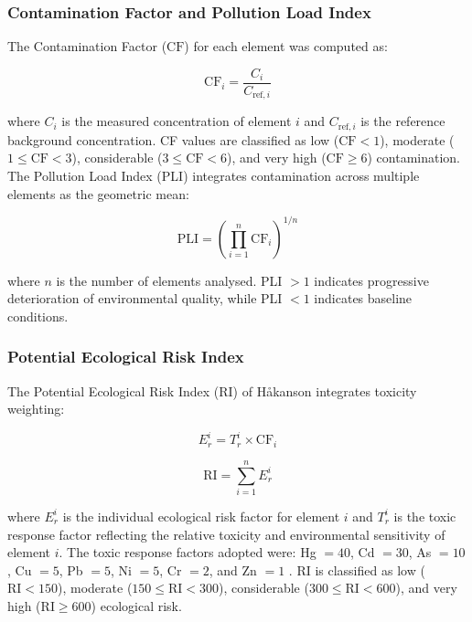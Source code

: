 \documentclass[preprint,12pt,number]{elsarticle}
\begin{document}
\subsubsection{Contamination Factor and Pollution Load Index}

The Contamination Factor ($\text{CF}$) for each element was computed as:

\begin{equation}
\text{CF}_i = \frac{C_i}{C_{\text{ref},i}}
\label{eq:cf}
\end{equation}

\noindent where $C_i$ is the measured concentration of element $i$ and $C_{\text{ref},i}$ is the reference background concentration. CF values are classified as low ($\text{CF} < 1$), moderate ($1 \leq \text{CF} < 3$), considerable ($3 \leq \text{CF} < 6$), and very high ($\text{CF} \geq 6$) contamination. The Pollution Load Index (PLI) integrates contamination across multiple elements as the geometric mean:

\begin{equation}
\text{PLI} = \left(\prod_{i=1}^{n} \text{CF}_i\right)^{1/n}
\label{eq:pli}
\end{equation}

\noindent where $n$ is the number of elements analysed. PLI $> 1$ indicates progressive deterioration of environmental quality, while PLI $< 1$ indicates baseline conditions.

\subsubsection{Potential Ecological Risk Index}

The Potential Ecological Risk Index (RI) of H\r{a}kanson \cite{Hakanson1980} integrates toxicity weighting:

\begin{equation}
E_r^i = T_r^i \times \text{CF}_i
\label{eq:er}
\end{equation}

\begin{equation}
\text{RI} = \sum_{i=1}^{n} E_r^i
\label{eq:ri}
\end{equation}

\noindent where $E_r^i$ is the individual ecological risk factor for element $i$ and $T_r^i$ is the toxic response factor reflecting the relative toxicity and environmental sensitivity of element $i$. The toxic response factors adopted were: Hg $= 40$, Cd $= 30$, As $= 10$, Cu $= 5$, Pb $= 5$, Ni $= 5$, Cr $= 2$, and Zn $= 1$ \cite{Hakanson1980}. RI is classified as low ($\text{RI} < 150$), moderate ($150 \leq \text{RI} < 300$), considerable ($300 \leq \text{RI} < 600$), and very high ($\text{RI} \geq 600$) ecological risk.
\end{document}
